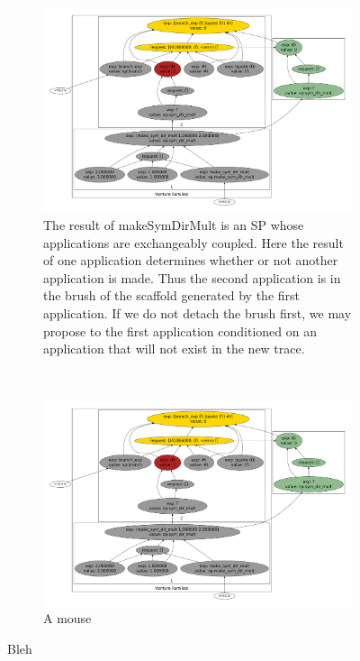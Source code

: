 \documentclass[a4paper,12pt]{article}
\begin{document}
\begin{figure}
        \centering
        \begin{subfigure}[b]{0.3\textwidth}
                \includegraphics[width=\textwidth]{prior/dot3.pdf}
                \caption{The result of makeSymDirMult is an SP whose applications are exchangeably coupled. Here the result of one application determines whether or not another application is made. Thus the second application is in the brush of the scaffold generated by the first application. If we do not detach the brush first, we may propose to the first application conditioned on  an application that will not exist in the new trace.
}
                \label{fig:gull}
        \end{subfigure}%
 
        ~ %
        \begin{subfigure}[b]{0.3\textwidth}
                \includegraphics[width=\textwidth]{prior/dot3.pdf}
                \caption{A mouse}
                \label{fig:mouse}
        \end{subfigure}
        \caption{Bleh}

\label{fig:animals}
\end{figure}
\end{document}
